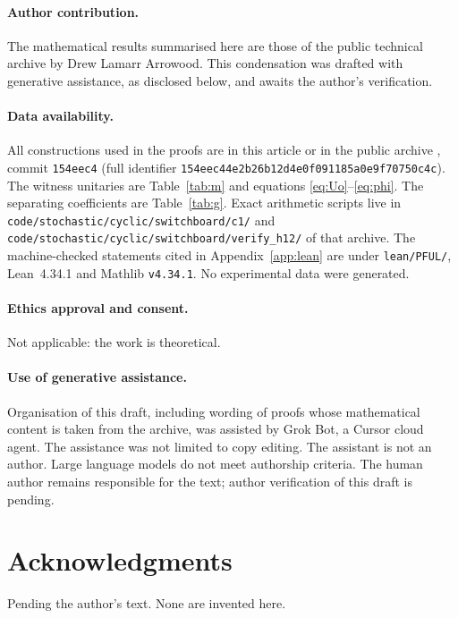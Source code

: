 \documentclass[11pt]{article}
\theoremstyle{definition}
\theoremstyle{remark}
\begin{document}
\paragraph{Author contribution.}
The mathematical results summarised here are those of the public technical archive by Drew Lamarr Arrowood. This condensation was drafted with generative assistance, as disclosed below, and awaits the author's verification.

\paragraph{Data availability.}
All constructions used in the proofs are in this article or in the public archive \cite{archive}, commit \texttt{154eec4} (full identifier \texttt{154eec44e2b26b12d4e0f091185a0e9f70750c4c}). The witness unitaries are Table~\ref{tab:m} and equations \eqref{eq:Uo}--\eqref{eq:phi}. The separating coefficients are Table~\ref{tab:g}. Exact arithmetic scripts live in \texttt{code/stochastic/cyclic/switchboard/c1/} and \texttt{code/stochastic/cyclic/switchboard/verify\_h12/} of that archive. The machine-checked statements cited in Appendix~\ref{app:lean} are under \texttt{lean/PFUL/}, Lean~4.34.1 and Mathlib \texttt{v4.34.1}. No experimental data were generated.

\paragraph{Ethics approval and consent.}
Not applicable: the work is theoretical.

\paragraph{Use of generative assistance.}
Organisation of this draft, including wording of proofs whose mathematical content is taken from the archive, was assisted by Grok Bot, a Cursor cloud agent. The assistance was not limited to copy editing. The assistant is not an author. Large language models do not meet authorship criteria. The human author remains responsible for the text; author verification of this draft is pending.

\section*{Acknowledgments}
Pending the author's text. None are invented here.

\appendix
\end{document}
